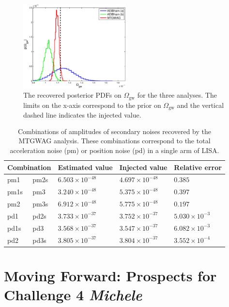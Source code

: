 \documentclass{iopart}
\begin{document}
\begin{figure}
\centering
\includegraphics[width=0.5\textwidth]{stochastic_pdfs.eps}
\caption{The recovered posterior PDFs on $\Omega_{\mathrm{gw}}$ for the three analyses. The limits on the x-axis correspond to the prior on 
$\Omega_{\mathrm{gw}}$ and the vertical dashed line indicates the injected 
value.
\label{fig:stochastic_pdf}}
\end{figure}

\begin{table}
\begin{center}
\begin{tabular}{l@{+}l|lll}
\hline
\multicolumn{2}{l|}{Combination} & Estimated value & Injected value & Relative error \\
\hline
pm1 & pm2s & $6.503 \times 10^{-48}$ & $4.697 \times 10^{-48}$ & $0.385$ \\ 
pm1s & pm3 & $3.240 \times 10^{-48}$ & $5.375 \times 10^{-48}$ & $0.397$ \\ 
pm2 & pm3s & $6.912 \times 10^{-48}$ & $5.775 \times 10^{-48}$ & $0.197$ \\ 
pd1 & pd2s & $3.733 \times 10^{-37}$ & $3.752 \times 10^{-37}$ & $5.030 \times 10^{-3}$ \\ 
pd1s & pd3 & $3.568 \times 10^{-37}$ & $3.547 \times 10^{-37}$ & $6.082 \times 10^{-3}$ \\ 
pd2 & pd3s & $3.805 \times 10^{-37}$ & $3.804 \times 10^{-37}$ & $3.552 \times 10^{-4}$ \\ 
\hline
\end{tabular}
\end{center}
\caption{Combinations of amplitudes of secondary noises 
recovered by the MTGWAG analysis. These combinations correspond to the total
acceleration noise (pm) or position noise (pd) in a single arm of LISA.
\label{tab:MTGWAG_noise_est}
}
\end{table} 


\section{Moving Forward: Prospects for Challenge 4 {\it Michele}}
\end{document}
